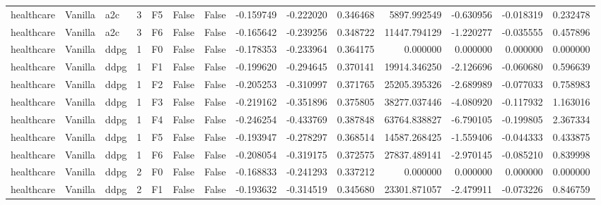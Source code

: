 \begin{tabular}{lllrlllrrrrrrr}
healthcare & Vanilla &       a2c &     3 &  F5 &           False &            False & -0.159749 & -0.222020 & 0.346468 &      5897.992549 &          -0.630956 &       -0.018319 &            0.232478 \\
healthcare & Vanilla &       a2c &     3 &  F6 &           False &            False & -0.165642 & -0.239256 & 0.348722 &     11447.794129 &          -1.220277 &       -0.035555 &            0.457896 \\
healthcare & Vanilla &      ddpg &     1 &  F0 &           False &            False & -0.178353 & -0.233964 & 0.364175 &         0.000000 &           0.000000 &        0.000000 &            0.000000 \\
healthcare & Vanilla &      ddpg &     1 &  F1 &           False &            False & -0.199620 & -0.294645 & 0.370141 &     19914.346250 &          -2.126696 &       -0.060680 &            0.596639 \\
healthcare & Vanilla &      ddpg &     1 &  F2 &           False &            False & -0.205253 & -0.310997 & 0.371765 &     25205.395326 &          -2.689989 &       -0.077033 &            0.758983 \\
healthcare & Vanilla &      ddpg &     1 &  F3 &           False &            False & -0.219162 & -0.351896 & 0.375805 &     38277.037446 &          -4.080920 &       -0.117932 &            1.163016 \\
healthcare & Vanilla &      ddpg &     1 &  F4 &           False &            False & -0.246254 & -0.433769 & 0.387848 &     63764.838827 &          -6.790105 &       -0.199805 &            2.367334 \\
healthcare & Vanilla &      ddpg &     1 &  F5 &           False &            False & -0.193947 & -0.278297 & 0.368514 &     14587.268425 &          -1.559406 &       -0.044333 &            0.433875 \\
healthcare & Vanilla &      ddpg &     1 &  F6 &           False &            False & -0.208054 & -0.319175 & 0.372575 &     27837.489141 &          -2.970145 &       -0.085210 &            0.839998 \\
healthcare & Vanilla &      ddpg &     2 &  F0 &           False &            False & -0.168833 & -0.241293 & 0.337212 &         0.000000 &           0.000000 &        0.000000 &            0.000000 \\
healthcare & Vanilla &      ddpg &     2 &  F1 &           False &            False & -0.193632 & -0.314519 & 0.345680 &     23301.871057 &          -2.479911 &       -0.073226 &            0.846759 \\

\end{tabular}
